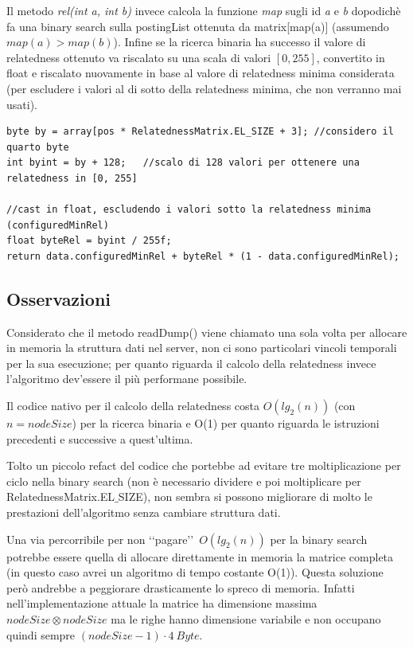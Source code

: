 Il metodo \textit{rel(int a, int b)} invece calcola la funzione \textit{map} sugli id \textit{a} e \textit{b} dopodichè fa una binary search sulla postingList 
ottenuta da matrix[map(a)] (assumendo $map(a) > map(b)$). Infine se la ricerca binaria ha successo il valore di relatedness ottenuto va riscalato su una scala di valori 
$[0, 255]$, convertito in float e riscalato nuovamente in base al valore di relatedness minima considerata (per escludere i valori al di sotto della relatedness minima,
che non verranno mai usati).  

\begin{lstlisting}[style=JavaStyle]
byte by = array[pos * RelatednessMatrix.EL_SIZE + 3]; //considero il quarto byte 
int byint = by + 128;   //scalo di 128 valori per ottenere una relatedness in [0, 255]

//cast in float, escludendo i valori sotto la relatedness minima (configuredMinRel)
float byteRel = byint / 255f; 
return data.configuredMinRel + byteRel * (1 - data.configuredMinRel);
\end{lstlisting}

\subsection{Osservazioni}
Considerato che il metodo readDump() viene chiamato una sola volta per allocare in memoria la struttura dati nel server, 
non ci sono particolari vincoli temporali per la sua esecuzione; per quanto riguarda il calcolo della relatedness invece 
l'algoritmo dev'essere il più performane possibile.

Il codice nativo per il calcolo della relatedness costa $O(lg_2(n))$ (con $n=nodeSize$) per la ricerca binaria e O(1) per quanto riguarda le 
istruzioni precedenti e successive a quest'ultima.

Tolto un piccolo refact del codice che portebbe ad evitare tre moltiplicazione per ciclo nella binary search (non è necessario dividere e poi moltiplicare per 
RelatednessMatrix.EL$\_$SIZE), non sembra si possono migliorare di molto le prestazioni dell'algoritmo senza cambiare struttura dati.

Una via percorribile per non \lq\lq pagare\rq\rq\ $O(lg_2(n))$ per la binary search potrebbe essere quella di allocare direttamente in memoria la matrice 
completa (in questo caso avrei un algoritmo di tempo costante O(1)). Questa soluzione però andrebbe a peggiorare drasticamente lo spreco di memoria.
Infatti nell'implementazione attuale la matrice ha dimensione massima $nodeSize \otimes nodeSize$ ma le righe hanno dimensione variabile e 
non occupano quindi sempre $(nodeSize -1) \cdot 4\ Byte$.

